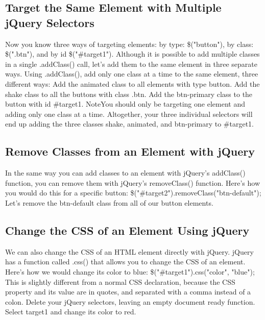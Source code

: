 \documentclass{article}%
\begin{document}
%
\subsection{Target the Same Element with Multiple jQuery Selectors}%
\label{subsec:TargettheSameElementwithMultiplejQuerySelectors}%
Now you know three ways of targeting elements: by type: \$("button"), by class: \$(".btn"), and by id \$("\#target1").\newline%
Although it is possible to add multiple classes in a single .addClass() call, let's add them to the same element in three separate ways.\newline%
Using .addClass(), add only one class at a time to the same element, three different ways:\newline%
Add the animated class to all elements with type button.\newline%
Add the shake class to all the buttons with class .btn.\newline%
Add the btn{-}primary class to the button with id \#target1.\newline%
NoteYou should only be targeting one element and adding only one class at a time. Altogether, your three individual selectors will end up adding the three classes shake, animated, and btn{-}primary to \#target1.\newline%

%
\subsection{Remove Classes from an Element with jQuery}%
\label{subsec:RemoveClassesfromanElementwithjQuery}%
In the same way you can add classes to an element with jQuery's addClass() function, you can remove them with jQuery's removeClass() function.\newline%
Here's how you would do this for a specific button:\newline%
\$("\#target2").removeClass("btn{-}default");\newline%
Let's remove the btn{-}default class from all of our button elements.\newline%

%
\subsection{Change the CSS of an Element Using jQuery}%
\label{subsec:ChangetheCSSofanElementUsingjQuery}%
We can also change the CSS of an HTML element directly with jQuery.\newline%
jQuery has a function called .css() that allows you to change the CSS of an element.\newline%
Here's how we would change its color to blue:\newline%
\$("\#target1").css("color", "blue");\newline%
This is slightly different from a normal CSS declaration, because the CSS property and its value are in quotes, and separated with a comma instead of a colon.\newline%
Delete your jQuery selectors, leaving an empty document ready function.\newline%
Select target1 and change its color to red.\newline%
\end{document}
